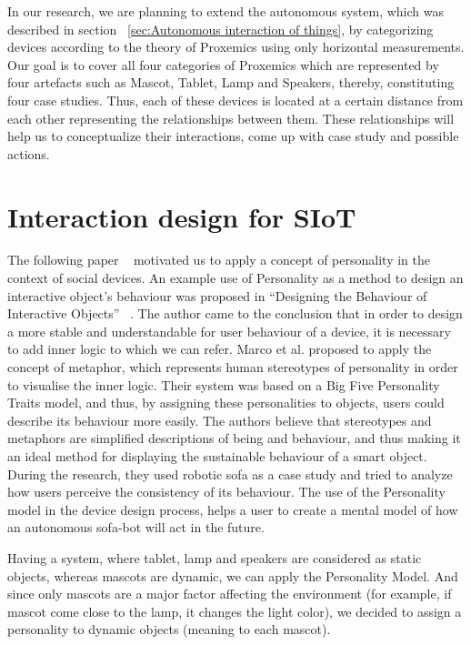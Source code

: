 \par In our research, we are planning to extend the autonomous system, which was
described in section ~\ref{sec:Autonomous interaction of things}, by categorizing devices
according to the theory of Proxemics using only horizontal measurements.
Our goal is to cover all four categories of Proxemics which are represented by four
artefacts such as Mascot, Tablet, Lamp and Speakers, thereby, constituting four case studies.
Thus, each of these devices is located at a certain distance from each other representing
the relationships between them.
These relationships will help us to conceptualize their interactions, come up with case study and possible actions.

\section{Interaction design for SIoT}
\label{sec:Interaction design for SIoT}

\par The following paper ~\cite{soro2018social} motivated us to apply a concept of
personality in the context of social devices.
An example use of Personality as a method to design an interactive object’s behaviour
was proposed in “Designing the Behaviour of Interactive Objects” ~\cite{spadafora2016designing}.
The author came to the conclusion that in order to design a more stable and understandable
for user behaviour of a device, it is necessary to add inner logic to which we can refer.
Marco et al. proposed to apply the concept of metaphor, which represents human stereotypes
of personality in order to visualise the inner logic.
Their system was based on a Big Five Personality Traits model, and thus,
by assigning these personalities to objects, users could describe its behaviour more easily.
The authors believe that stereotypes and metaphors are simplified descriptions of being and behaviour,
and thus making it an ideal method for displaying the sustainable behaviour of a smart object.
During the research, they used robotic sofa as a case study and tried to analyze how
users perceive the consistency of its behaviour.
The use of the Personality model in the device design process, helps a user to create
a mental model of how an autonomous sofa-bot will act in the future.

Having a system, where tablet, lamp and speakers are considered as static objects,
whereas mascots are dynamic, we can apply the Personality Model.
And since only mascots are a major factor affecting the environment
(for example, if mascot come close to the lamp, it changes the light color), we decided to
assign a personality to dynamic objects (meaning to each mascot).

